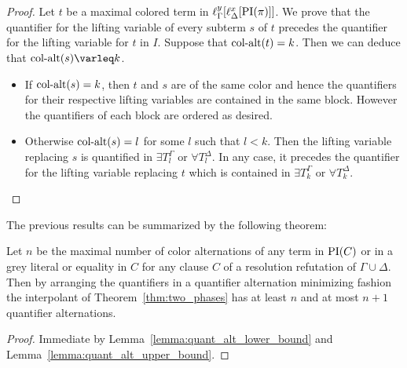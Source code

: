 \begin{proof}
	Let $t$ be a maximal colored term in $\ell_{\Gamma}^{y}[\ell_{\Delta}^{x}[\operatorname{PI}(\pi)]]$. 
	We prove that the quantifier for the lifting variable of every subterm $s$ of $t$ precedes the quantifier for the lifting variable for $t$ in $I$.
	Suppose that $\operatorname{col-alt}(t) = k$. Then we can deduce that $\ca(s) \varleq\nolinebreak{} k$.
	\begin{itemize}
		\item
			If $\operatorname{col-alt}(s) = k$, then $t$ and $s$ are of the same color and hence the quantifiers for their respective lifting variables are contained in the same block. 
			However the quantifiers of each block are ordered as desired.
		\item
			Otherwise $\operatorname{col-alt}(s) = l$ for some $l$ such that $l < k$.
			Then the lifting variable replacing $s$ is quantified in
			$\exists T_{l}^\Gamma$ or
			$\forall T_{l}^\Delta$.
			In any case, it precedes the quantifier for the lifting variable replacing $t$ which is contained in 
			$\exists T_{k}^\Gamma$ or
			$\forall T_{k}^\Delta$.
			\qedhere
	\end{itemize}
\end{proof}

The previous results can be summarized by the following theorem:\nopagebreak

\begin{thm}
	Let $n$ be the maximal number of color alternations of any term in $\operatorname{PI}(C)$ or in a grey literal or equality in $C$ for any clause $C$ of a resolution refutation of $\Gamma \cup \Delta$.
	Then by arranging the quantifiers in a quantifier alternation minimizing fashion the interpolant of Theorem~\ref{thm:two_phases} has at least $n$ and at most $n+1$ quantifier alternations.
\end{thm}
\begin{proof}
	Immediate by Lemma~\ref{lemma:quant_alt_lower_bound} and Lemma~\ref{lemma:quant_alt_upper_bound}.
\end{proof}



